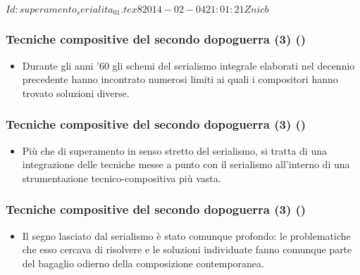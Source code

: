 %
%
\svnInfo $Id: superamento_serialita_01.tex 8 2014-02-04 21:01:21Z nicb $

\setcounter{ms}{0}
\begin{frame}
    \frametitle{\normalsize Tecniche compositive del secondo dopoguerra (3) ()}

    \begin{itemize}

        \item Durante gli anni '60 gli schemi del serialismo integrale
            elaborati nel decennio precedente hanno incontrato numerosi limiti
            ai quali i compositori hanno trovato soluzioni diverse.

    \end{itemize}

\end{frame}

\begin{frame}
    \frametitle{\normalsize Tecniche compositive del secondo dopoguerra (3) ()}

    \begin{itemize}

        \item Pi\`u che di superamento in senso stretto
            del serialismo, si tratta di una integrazione
            delle tecniche messe a punto con il
            serialismo all'interno di una strumentazione tecnico-compositiva
            pi\`u vasta.

    \end{itemize}

\end{frame}
    
\begin{frame}
    \frametitle{\normalsize Tecniche compositive del secondo dopoguerra (3) ()}

    \begin{itemize}

        \item Il segno lasciato dal serialismo
            \`e stato comunque profondo:
            le problematiche che esso cercava di risolvere
            e le soluzioni individuate
            fanno comunque parte del bagaglio odierno
            della composizione contemporanea.

    \end{itemize}

\end{frame}
